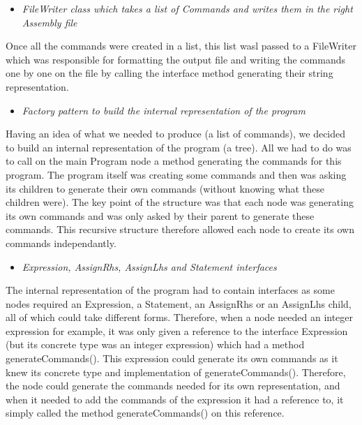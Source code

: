\documentclass[a4wide, 11pt]{article}
\begin{document}
\begin{itemize}
\item \textit{FileWriter class which takes a list of Commands and writes them in the right Assembly file}
\end{itemize}

Once all the commands were created in a list, this list wasl passed to a FileWriter which was responsible for formatting the output file and writing the commands one by one on the file by calling the interface method generating their string representation.

\begin{itemize}
\item \textit{Factory pattern to build the internal representation of the program}
\end{itemize}

Having an idea of what we needed to produce (a list of commands), we decided to build an internal representation of the program (a tree). All we had to do was to call on the main Program node a method generating the commands for this program. The program itself was creating some commands and then was asking its children to generate their own commands (without knowing what these children were). The key point of the structure was that each node was generating its own commands and was only asked by their parent to generate these commands.
This recursive structure therefore allowed each node to create its own commands independantly.

\begin{itemize}
\item \textit{Expression, AssignRhs, AssignLhs and Statement interfaces}
\end{itemize}

The internal representation of the program had to contain interfaces as some nodes required an Expression, a Statement, an AssignRhs or an AssignLhs child, all of which could take different forms. Therefore, when a node needed an integer expression for example, it was only given a reference to the interface Expression (but its concrete type was an integer expression) which had a method generateCommands(). This expression could generate its own commands as it knew its concrete type and implementation of generateCommands(). Therefore, the node could generate the commands needed for its own representation, and when it needed to add the commands of the expression it had a reference to, it simply called the method generateCommands() on this reference.
\end{document}
